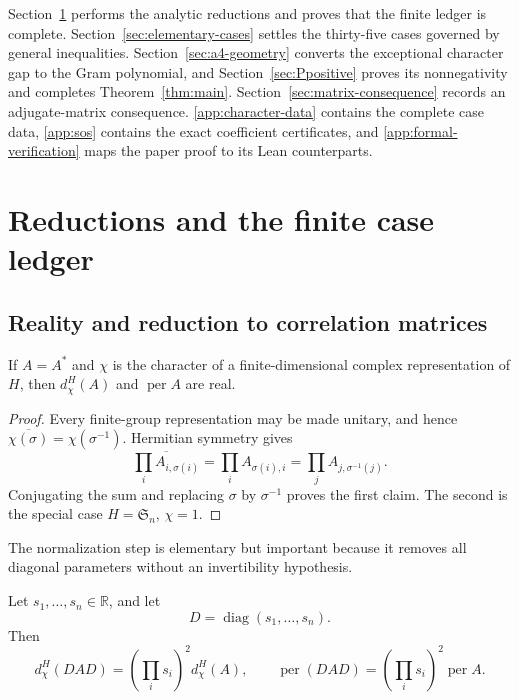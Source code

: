 \documentclass[10pt,twoside]{siamart1116}
\newcommand{\RR}{\mathbb R}
\newcommand{\Sn}{\mathfrak S}
\newcommand{\per}{\operatorname{per}}
\newcommand{\diag}{\operatorname{diag}}
\begin{document}
Section~\ref{sec:statement-reductions} performs the analytic reductions and
proves that the finite ledger is complete.  Section~\ref{sec:elementary-cases}
settles the thirty-five cases governed by general inequalities.
Section~\ref{sec:a4-geometry} converts the exceptional character gap to the
Gram polynomial, and Section~\ref{sec:Ppositive} proves its nonnegativity and
completes Theorem~\ref{thm:main}.  Section~\ref{sec:matrix-consequence}
records an adjugate-matrix consequence.  \ref{app:character-data} contains
the complete case data, \ref{app:sos} contains the exact coefficient
certificates, and \ref{app:formal-verification} maps
the paper proof to its Lean counterparts.

\section{Reductions and the finite case ledger}\label{sec:statement-reductions}

\subsection{Reality and reduction to correlation matrices}

\begin{lemma}[Reality]\label{lem:reality}
If $A=A^*$ and $\chi$ is the character of a finite-dimensional complex
representation of $H$, then $d_\chi^H(A)$ and $\per A$ are real.
\end{lemma}

\begin{proof}
Every finite-group representation may be made unitary, and hence
$\overline{\chi(\sigma)}=\chi(\sigma^{-1})$.  Hermitian symmetry gives
\[
 \overline{\prod_i A_{i,\sigma(i)}}
 =\prod_i A_{\sigma(i),i}
 =\prod_j A_{j,\sigma^{-1}(j)}.
\]
Conjugating the sum and replacing $\sigma$ by $\sigma^{-1}$ proves the first
claim.  The second is the special case $H=\Sn_n$, $\chi=1$.
\end{proof}

The normalization step is elementary but important because it removes all
diagonal parameters without an invertibility hypothesis.

\begin{lemma}\label{lem:scaling}
Let $s_1,\dots,s_n\in\RR$, and let
\[
 D=\diag(s_1,\dots,s_n).
\]
Then
\[
 d_\chi^H(DAD)=\left(\prod_i s_i\right)^2d_\chi^H(A),
 \qquad
 \per(DAD)=\left(\prod_i s_i\right)^2\per A.
\]
\end{lemma}
\end{document}
